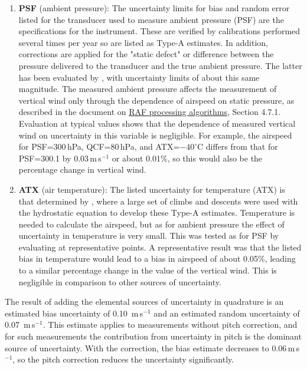 \documentclass[12pt,twoside,english]{article}\usepackage[]{graphicx}\usepackage[]{color}
\let\OrgIndex\index
\renewcommand*{\index}[1]{\OrgIndex{#1}}
\begin{document}
\begin{enumerate}
\item \textbf{PSF} (ambient pressure): The uncertainty limits for bias and random error listed for the transducer used to measure ambient pressure (PSF) are the specifications for the instrument. These are verified by calibrations performed several times per year so are listed as Type-A estimates. In addition, corrections are applied for the "static defect" or difference between the pressure delivered to the transducer and the true ambient pressure. The latter has been evaluated by \citet{CooperEtAl2014}, with uncertainty limits of about this same magnitude. The measured ambient pressure affects the measurement of vertical wind only through the dependence of airspeed on static pressure, as described in the document on \href{https://drive.google.com/file/d/0B1kIUH45ca5ATFV5d3QyQ0JpSjA/view?usp=sharing}{RAF processing algorithms}, Section 4.7.1. Evaluation at typical values shows that the dependence of measured vertical wind on uncertainty in this variable is negligible. For example, the airspeed for PSF=300\,hPa, QCF=80\,hPa, and ATX=$-40^{\circ}$C differs from that for PSF=300.1 by 0.03\,m\,s$^{-1}$ or about 0.01\%, so this would also be the percentage change in vertical wind.  
\item \textbf{ATX} (air temperature): The listed uncertainty for temperature (ATX) is that determined by \citet{CooperEtAl2014}, where a large set of climbs and descents were used with the hydrostatic equation to develop these Type-A estimates. Temperature is needed to calculate the airspeed, but as for ambient pressure the effect of uncertainty in temperature is very small. This was tested as for PSF by evaluating at representative points. A representative result was that the listed bias in temperature would lead to a bias in airspeed of about 0.05\%, leading to a similar percentage change in the value of the vertical wind. This is negligible in comparison to other sources of uncertainty.  
\end{enumerate}

The result of adding the elemental sources of uncertainty in quadrature is an estimated bias uncertainty of %
0.10~m\,s$^{-1}$ and an estimated random uncertainty of %
0.07~m\,s$^{-1}$. This estimate applies to measurements without pitch correction, and for such measurements the contribution from uncertainty in pitch is the dominant source of uncertainty. With the correction, the bias estimate decreases to 0.06\,m\,s$^{-1}$, so the pitch correction reduces the uncertainty significantly. 
\end{document}
